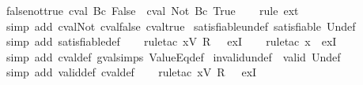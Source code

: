 \begin{isabellebody}
\ false{\isacharunderscore}not{\isacharunderscore}true{\isacharcolon}\ {\isachardoublequoteopen}cval\ {\isacharparenleft}Bc\ False{\isacharparenright}\ {\isacharequal}\ cval\ {\isacharparenleft}Not\ {\isacharparenleft}Bc\ True{\isacharparenright}{\isacharparenright}{\isachardoublequoteclose}\isanewline
%
\isadelimproof
\ \ %
\endisadelimproof
%
\isatagproof
{}\isamarkupfalse%
\ {\isacharparenleft}rule\ ext{\isacharparenright}{\isacharplus}\isanewline
\ \ \isamarkupfalse%
\ {\isacharparenleft}simp\ add{\isacharcolon}\ cval{\isacharunderscore}Not\ cval{\isacharunderscore}false\ cval{\isacharunderscore}true{\isacharparenright}%
\endisatagproof
{\isafoldproof}%
%
\isadelimproof
\isanewline
%
\endisadelimproof
\isanewline
{}\isamarkupfalse%
\ satisfiable{\isacharunderscore}undef{\isacharcolon}\ {\isachardoublequoteopen}satisfiable\ Undef{\isachardoublequoteclose}\isanewline
%
\isadelimproof
\ \ %
\endisadelimproof
%
\isatagproof
{}\isamarkupfalse%
\ {\isacharparenleft}simp\ add{\isacharcolon}\ satisfiable{\isacharunderscore}def{\isacharparenright}\isanewline
\ \ \isamarkupfalse%
\ {\isacharparenleft}rule{\isacharunderscore}tac\ x{\isacharequal}{\isachardoublequoteopen}V\ {\isacharparenleft}R\ {}{\isacharparenright}{\isachardoublequoteclose}\ \ exI{\isacharparenright}\isanewline
\ \ \isamarkupfalse%
\ {\isacharparenleft}rule{\isacharunderscore}tac\ x{\isacharequal}{\isachardoublequoteopen}{\isacharless}{\isachargreater}{\isachardoublequoteclose}\ \ exI{\isacharparenright}\isanewline
\ \ \isamarkupfalse%
\ {\isacharparenleft}simp\ add{\isacharcolon}\ cval{\isacharunderscore}def\ gval{\isachardot}simps\ ValueEq{\isacharunderscore}def{\isacharparenright}%
\endisatagproof
{\isafoldproof}%
%
\isadelimproof
\isanewline
%
\endisadelimproof
\isanewline
{}\isamarkupfalse%
\ invalid{\isacharunderscore}undef{\isacharcolon}\ {\isachardoublequoteopen}{\isasymnot}\ valid\ Undef{\isachardoublequoteclose}\isanewline
%
\isadelimproof
\ \ %
\endisadelimproof
%
\isatagproof
{}\isamarkupfalse%
\ {\isacharparenleft}simp\ add{\isacharcolon}\ valid{\isacharunderscore}def\ cval{\isacharunderscore}def{\isacharparenright}\isanewline
\ \ \isamarkupfalse%
\ {\isacharparenleft}rule{\isacharunderscore}tac\ x{\isacharequal}{\isachardoublequoteopen}V\ {\isacharparenleft}R\ {}{\isacharparenright}{\isachardoublequoteclose}\ \ exI{\isacharparenright}\isanewline
\ \ \isamarkupfalse%

\end{isabellebody}
